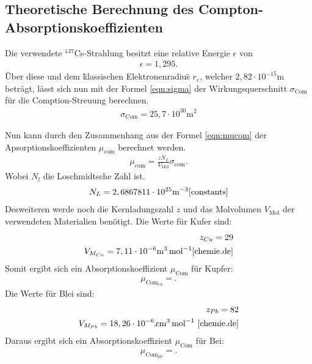 \subsection{Theoretische Berechnung des Compton-Absorptionskoeffizienten}
Die verwendete $^{137}$Cs-Strahlung besitzt eine relative Energie $\epsilon$ von
\begin{align*}
  \epsilon=1,295.
\end{align*}
Über diese und dem \"klassischen Elektronenradius\" $r_e$, welcher $2,82\cdot10^{-15}\si{\meter}$
beträgt, lässt sich nun mit der Formel \eqref{eqn:sigma}
der Wirkungsquerschnitt $\sigma_\mathrm{Com}$ für die Comption-Streuung
berechnen.
\begin{align*}
\sigma_\mathrm{Com}=25,7\cdot10^{30}\si{\meter\tothe{2}}
\end{align*}

Nun kann durch den Zusammenhang aus der Formel \eqref{eqn:mucom} der
Apsorptionskoeffizienten $\mu_\mathrm{com}$ berechnet werden.
\begin{align}
\mu_\mathrm{com}=\frac{zN_L}{V_\mathrm{Mol}}\sigma_\mathrm{com}.\label{eqn:mucom}
\end{align}
Wobei $N_l$ die Loschmidtsche Zahl ist.
\begin{align*}
N_L=2,6867811\cdot10^{25}\si{\per\meter\tothe{3}}\text{\cite{constants}}
\end{align*}
Desweiteren werde noch die
Kernladungszahl $z$ und das Molvolumen $V_\mathrm{Mol}$ der
verwendeten Materialien  benötigt.
Die Werte für Kufer sind:
\begin{align*}
z_{Cu}=29\\
V_{M_{Cu}}=7,11 \cdot 10^{-6}\si{\meter\tothe{3}\per\mol} \text{\cite{chemie.de}}
\end{align*}
Somit ergibt sich ein Absorptionskoeffizient $\mu_\mathrm{Com}$ für Kupfer:
\begin{align*}
  \mu_\mathrm{Com_{cu}}=.
\end{align*}
Die Werte für Blei sind:
\begin{align*}
z_{Pb}=82\\
V_{M_{Pb}}=18,26 \cdot 10^{-6}x\si{\meter\tothe{3}\per\mol} \text{ \cite{chemie.de}}
\end{align*}
Daraus ergibt sich ein Absorptionskoeffizient $\mu_\mathrm{Com}$ für Bei:
\begin{align*}
  \mu_\mathrm{Com_{pb}}=.
\end{align*}

